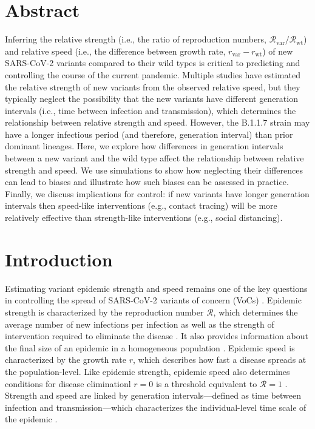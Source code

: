 \documentclass[12pt]{article}
\date{\today}
\newcommand{\vvvar}{\mathrm{var}}
\newcommand{\wwwt}{\mathrm{wt}}
\newcommand{\rx}[1]{\ensuremath{{r}_{#1}}\xspace}
\newcommand{\rw}{\rx{\wwwt}}
\newcommand{\rv}{\rx{\vvvar}}
\newcommand{\Rx}[1]{\ensuremath{{\mathcal R}_{#1}}\xspace}
\newcommand{\RR}{\ensuremath{{\mathcal R}}\xspace}
\newcommand{\Rw}{\Rx{\wwwt}}
\newcommand{\Rv}{\Rx{\vvvar}}
\begin{document}
\begin{flushleft}{
	\Large
	\textbf{}
}
\end{flushleft}

\section*{Abstract}

Inferring the relative strength (i.e., the ratio of reproduction numbers, $\Rv/\Rw$) and relative speed (i.e., the difference between growth rate, $\rv-\rw$) of new SARS-CoV-2 variants compared to their wild types is critical to predicting and controlling the course of the current pandemic.
Multiple studies have estimated the relative strength of new variants from the observed relative speed, but they typically neglect the possibility that the new variants have different generation intervals (i.e., time between infection and transmission), which determines the relationship between relative strength and speed.
However, the B.1.1.7 strain may have a longer infectious period (and therefore, generation interval) than prior dominant lineages.
Here, we explore how differences in generation intervals between a new variant and the wild type affect the relationship between relative strength and speed.
We use simulations to show how neglecting their differences can lead to biases and illustrate how such biases can be assessed in practice.
Finally, we discuss implications for control: if new variants have longer generation intervals then speed-like interventions (e.g., contact tracing) will be more relatively effective than strength-like interventions (e.g., social distancing).

\section{Introduction}

Estimating variant epidemic strength and speed remains one of the key questions in controlling the spread of SARS-CoV-2 variants of concern (VoCs) \citep{switzerland2021variant, davies2021estimated, di2021impact, leung2021early, volz2021transmission,zhao2021}.
Epidemic strength is characterized by the reproduction number $\RR$, which determines the average number of new infections per infection as well as the strength of intervention required to eliminate the disease \citep{anderson1991infectious}.
It also provides information about the final size of an epidemic in a homogeneous population \citep{anderson1991infectious}.
Epidemic speed is characterized by the growth rate $r$, which describes how fast a disease spreads at the population-level.
Like epidemic strength, epidemic speed also determines conditions for disease eliminationl $r=0$ is a threshold equivalent to $\RR=1$ \citep{doi:10.1098/rspb.2020.1556}.
Strength and speed are linked by generation intervals---defined as time between infection and transmission---which characterizes the individual-level time scale of the epidemic \citep{roberts2007model,svensson2007note,wallinga2007generation}.
\end{document}

